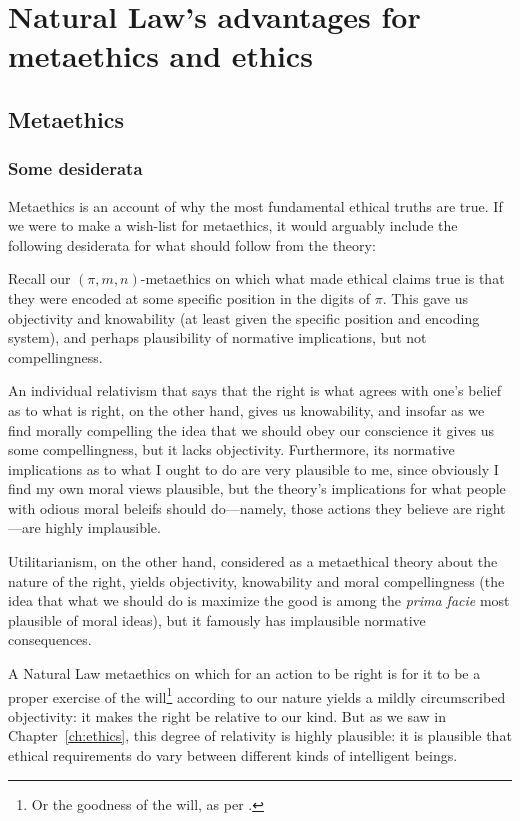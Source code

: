 \def\mychapter{III}
\chapter{Natural Law's advantages for metaethics and ethics}\label{ch:meta}
\section{Metaethics}
\subsection{Some desiderata}
Metaethics is an account of why the most fundamental ethical truths are true. If we were to make a wish-list
for metaethics, it would arguably include the following desiderata for what should follow from the theory:

Recall our $(\pi,m,n)$-metaethics on which what made ethical claims true is that they were encoded at some
specific position in the digits of $\pi$. This gave us objectivity and knowability (at least given
the specific position and encoding system), and perhaps plausibility of normative implications, but not
compellingness.

An individual relativism
that says that the right is what agrees with one's belief as to what is right,  on the
other hand, gives us knowability, and insofar as we find morally compelling the idea that we should obey
our conscience it gives us some compellingness, but it lacks objectivity. Furthermore, its normative implications as to
what I ought to do are very plausible to me, since obviously I find my own moral views plausible, but the theory's implications
for what people with odious moral beleifs should do---namely, those actions they believe are right---are highly implausible.

Utilitarianism, on the other hand, considered as a  metaethical theory about the nature of the right, yields objectivity, knowability
and moral compellingness (the idea that what we should do is maximize the good is among the \textit{prima facie} most plausible of moral ideas), but
it famously has  implausible normative consequences.

A Natural Law metaethics on which for an action to be right is for it to be a proper exercise of the will\footnote{Or 
the goodness of the will, as per .} according to our nature
yields a mildly circumscribed objectivity: it makes the right be relative to our kind. But as we saw in Chapter~\ref{ch:ethics}, this degree
of relativity is highly plausible: it is plausible that ethical requirements do vary between different kinds of intelligent
beings.

